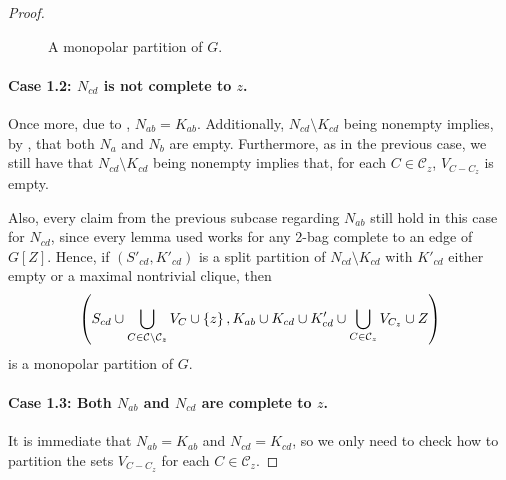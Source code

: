 \begin{proof}
\begin{figure}[htb!]
        \caption{A monopolar partition of $G$.}
        \label{fig:monopolar_partition_chordal_2}
    \end{figure}

    \paragraph{Case 1.2: $N_{cd}$ is not complete to $z$.} Once more, due to
    , $N_{ab}=K_{ab}$. Additionally, $N_{cd}\setminus
    K_{cd}$ being nonempty implies, by , that both
    $N_a$ and $N_b$ are empty. Furthermore, as in the previous case, we still
    have that $N_{cd}\setminus K_{cd}$ being nonempty implies that, for each $C\in
    \mathcal{C}_z$, $V_{C-C_z}$ is empty.
    
    Also, every claim from the previous subcase regarding $N_{ab}$ still hold in
    this case for $N_{cd}$, since every lemma used works for any 2-bag complete
    to an edge of $G[Z]$. Hence, if $(S'_{cd},K'_{cd})$ is a split partition of
    $N_{cd}\setminus K_{cd}$ with $K'_{cd}$ either empty or a maximal nontrivial
    clique, then
    \[
        \left(S_{cd} \cup \bigcup_{C\in\mathcal{C}\setminus 
        \mathcal{C}_z} V_C \cup \left\{z\right\} , K_{ab} \cup K_{cd} \cup K'_{cd} \cup 
        \bigcup_{C\in \mathcal{C}_z} V_{C_z} \cup Z\right)
    \]
    is a monopolar partition of $G$.

    \paragraph{Case 1.3: Both $N_{ab}$ and $N_{cd}$ are complete to $z$.} It is
    immediate that $N_{ab}=K_{ab}$ and $N_{cd}=K_{cd}$, so we only need to
    check how to partition the sets $V_{C-C_z}$ for each $C\in \mathcal{C}_z$.
    

\end{proof}
